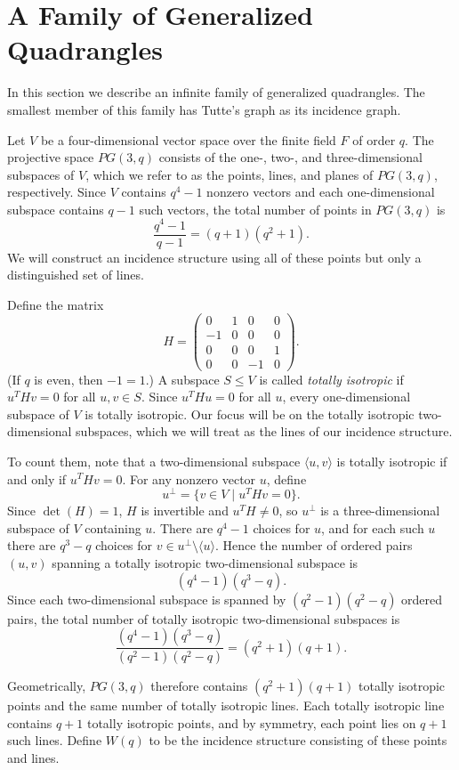 \documentclass[12pt,a4paper,openany]{book}
\begin{document}
\section{A Family of Generalized Quadrangles}
In this section we describe an infinite family of generalized quadrangles. The smallest member of this family has Tutte's graph as its incidence graph.

Let $V$ be a four-dimensional vector space over the finite field $F$ of order $q$. The projective space $PG(3,q)$ consists of the one-, two-, and three-dimensional subspaces of $V$, which we refer to as the points, lines, and planes of $PG(3,q)$, respectively. Since $V$ contains $q^4 - 1$ nonzero vectors and each one-dimensional subspace contains $q-1$ such vectors, the total number of points in $PG(3,q)$ is
\[
\frac{q^4 - 1}{q - 1} = (q+1)(q^2+1).
\]
We will construct an incidence structure using all of these points but only a distinguished set of lines.  

Define the matrix
\[
H = \begin{pmatrix}
0 & 1 & 0 & 0 \\ 
-1 & 0 & 0 & 0 \\ 
0 & 0 & 0 & 1 \\ 
0 & 0 & -1 & 0
\end{pmatrix}.
\]
(If $q$ is even, then $-1=1$.) A subspace $S \leq V$ is called \emph{totally isotropic} if $u^T H v = 0$ for all $u,v \in S$. Since $u^T H u = 0$ for all $u$, every one-dimensional subspace of $V$ is totally isotropic. Our focus will be on the totally isotropic two-dimensional subspaces, which we will treat as the lines of our incidence structure.

To count them, note that a two-dimensional subspace $\langle u,v \rangle$ is totally isotropic if and only if $u^T H v = 0$. For any nonzero vector $u$, define
\[
u^\perp = \{ v \in V \mid u^T H v = 0 \}.
\]
Since $\det(H)=1$, $H$ is invertible and $u^T H \neq 0$, so $u^\perp$ is a three-dimensional subspace of $V$ containing $u$. There are $q^4 - 1$ choices for $u$, and for each such $u$ there are $q^3 - q$ choices for $v \in u^\perp \setminus \langle u \rangle$. Hence the number of ordered pairs $(u,v)$ spanning a totally isotropic two-dimensional subspace is
\[
(q^4 - 1)(q^3 - q).
\]
Since each two-dimensional subspace is spanned by $(q^2 - 1)(q^2 - q)$ ordered pairs, the total number of totally isotropic two-dimensional subspaces is
\[
\frac{(q^4 - 1)(q^3 - q)}{(q^2 - 1)(q^2 - q)} = (q^2+1)(q+1).
\]

Geometrically, $PG(3,q)$ therefore contains $(q^2+1)(q+1)$ totally isotropic points and the same number of totally isotropic lines. Each totally isotropic line contains $q+1$ totally isotropic points, and by symmetry, each point lies on $q+1$ such lines. Define $W(q)$ to be the incidence structure consisting of these points and lines.
\end{document}
